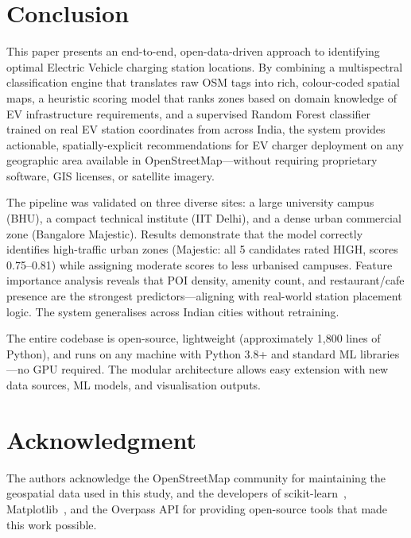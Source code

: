 \documentclass[conference]{IEEEtran}
\begin{document}
\section{Conclusion}

This paper presents an end-to-end, open-data-driven approach to identifying optimal Electric Vehicle charging station locations. By combining a multispectral classification engine that translates raw OSM tags into rich, colour-coded spatial maps, a heuristic scoring model that ranks zones based on domain knowledge of EV infrastructure requirements, and a supervised Random Forest classifier trained on real EV station coordinates from across India, the system provides actionable, spatially-explicit recommendations for EV charger deployment on any geographic area available in OpenStreetMap---without requiring proprietary software, GIS licenses, or satellite imagery.

The pipeline was validated on three diverse sites: a large university campus (BHU), a compact technical institute (IIT Delhi), and a dense urban commercial zone (Bangalore Majestic). Results demonstrate that the model correctly identifies high-traffic urban zones (Majestic: all 5 candidates rated HIGH, scores 0.75--0.81) while assigning moderate scores to less urbanised campuses. Feature importance analysis reveals that POI density, amenity count, and restaurant/cafe presence are the strongest predictors---aligning with real-world station placement logic. The system generalises across Indian cities without retraining.

The entire codebase is open-source, lightweight (approximately 1,800 lines of Python), and runs on any machine with Python 3.8+ and standard ML libraries---no GPU required. The modular architecture allows easy extension with new data sources, ML models, and visualisation outputs.

\section*{Acknowledgment}

The authors acknowledge the OpenStreetMap community for maintaining the geospatial data used in this study, and the developers of scikit-learn~\cite{b4}, Matplotlib~\cite{b8}, and the Overpass API for providing open-source tools that made this work possible.
\end{document}
